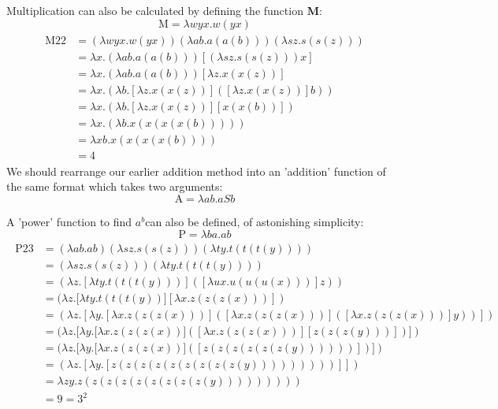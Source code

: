 \documentclass[Master.tex]{subfiles}
\begin{document}
Multiplication can also be calculated by defining the function \textbf{M}:
\begin{equation*}
\bm{\mathrm{M}} = \lambda wyx.w(yx)
\end{equation*}
\begin{gather*}
\begin{aligned}
\bm{\mathrm{M22}} &= (\lambda wyx.w(yx))(\lambda ab.a(a(b)))(\lambda sz.s(s(z)))\\
&= \lambda x.(\lambda ab.a(a(b)))[(\lambda sz.s(s(z)))x]\\
&= \lambda x.(\lambda ab.a(a(b)))[\lambda z.x(x(z))]\\
&= \lambda x.(\lambda b.[\lambda z.x(x(z))]([\lambda z.x(x(z))]b))\\
&= \lambda x.(\lambda b.[\lambda z.x(x(z))][x(x(b))])\\
&= \lambda x.(\lambda b.x(x(x(x(b)))))\\
&= \lambda xb.x(x(x(x(b))))\\
&= \bm{\mathrm{4}}
\end{aligned}
\end{gather*}
We should rearrange our earlier addition method into an 'addition' function of the same format which takes two arguments:
\begin{equation*}
\bm{\mathrm{A}} = \lambda ab.aSb
\end{equation*}

A 'power' function to find $a^b$can also be defined, of astonishing simplicity:
\begin{equation*}
\bm{\mathrm{P}} = \lambda ba.ab
\end{equation*}
\begin{gather*}
\begin{aligned}
\bm{\mathrm{P23}} &= (\lambda ab.ab)(\lambda sz.s(s(z)))(\lambda ty.t(t(t(y))))\\
&= (\lambda sz.s(s(z)))(\lambda ty.t(t(t(y))))\\
&= (\lambda z.[\lambda ty.t(t(t(y)))]([\lambda ux.u(u(u(x)))]z))\\
&= (\lambda z.[\lambda ty.t(t(t(y))][\lambda x.z(z(z(x)))])\\
&= (\lambda z.[\lambda y.[\lambda x.z(z(z(x)))]([\lambda x.z(z(z(x)))]([\lambda x.z(z(z(x)))]y))])\\
&= (\lambda z.[\lambda y.[\lambda x.z(z(z(x))]([\lambda x.z(z(z(x)))][z(z(z(y)))])])\\
&= (\lambda z.[\lambda y.[\lambda x.z(z(z(x))]([z(z(z(z(z(z(y))))))])])\\
&= (\lambda z.[\lambda y.[z(z(z(z(z(z(z(z(z(y)))))))))]])\\
&= \lambda zy.z(z(z(z(z(z(z(z(z(y)))))))))\\
&= \bm{\mathrm{9}} = \bm{\mathrm{3^2}}
\end{aligned}
\end{gather*}
\end{document}
